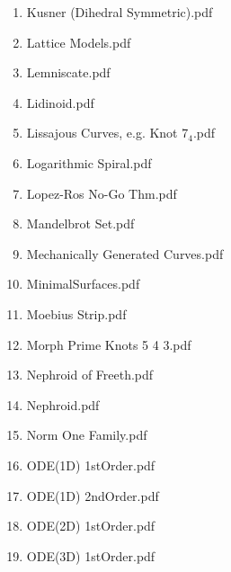 \documentclass[11pt]{article}
\begin{document}
\begin{enumerate}
\begin{enumerate}
\item Kusner (Dihedral Symmetric).pdf
\label{sec-1-1-1-1-29-20-74}

\item Lattice Models.pdf
\label{sec-1-1-1-1-29-20-75}

\item Lemniscate.pdf
\label{sec-1-1-1-1-29-20-76}

\item Lidinoid.pdf
\label{sec-1-1-1-1-29-20-77}

\item Lissajous Curves, e.g. Knot 7$_{\text{4}}$.pdf
\label{sec-1-1-1-1-29-20-78}

\item Logarithmic Spiral.pdf
\label{sec-1-1-1-1-29-20-79}

\item Lopez-Ros No-Go Thm.pdf
\label{sec-1-1-1-1-29-20-80}

\item Mandelbrot Set.pdf
\label{sec-1-1-1-1-29-20-81}

\item Mechanically Generated Curves.pdf
\label{sec-1-1-1-1-29-20-82}

\item MinimalSurfaces.pdf
\label{sec-1-1-1-1-29-20-83}

\item Moebius Strip.pdf
\label{sec-1-1-1-1-29-20-84}

\item Morph Prime Knots 5 4 3.pdf
\label{sec-1-1-1-1-29-20-85}

\item Nephroid of Freeth.pdf
\label{sec-1-1-1-1-29-20-86}

\item Nephroid.pdf
\label{sec-1-1-1-1-29-20-87}

\item Norm One Family.pdf
\label{sec-1-1-1-1-29-20-88}

\item ODE(1D) 1stOrder.pdf
\label{sec-1-1-1-1-29-20-89}

\item ODE(1D) 2ndOrder.pdf
\label{sec-1-1-1-1-29-20-90}

\item ODE(2D) 1stOrder.pdf
\label{sec-1-1-1-1-29-20-91}

\item ODE(3D) 1stOrder.pdf
\label{sec-1-1-1-1-29-20-92}


\end{enumerate}
\end{enumerate}
\end{document}
